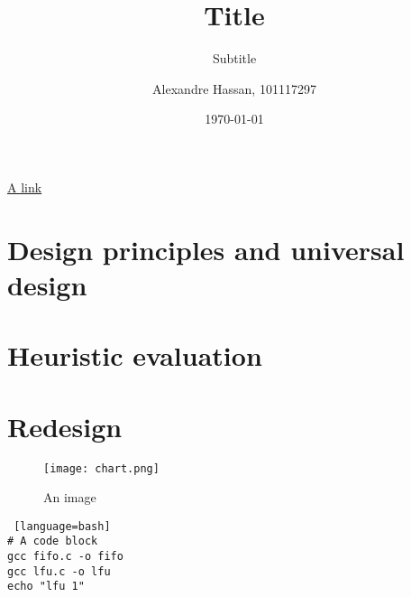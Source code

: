 \documentclass{article}
\title{Title}
\subtitle{Subtitle}
\author{Alexandre Hassan, 101117297 }
\date{\monthyeardate\today}
\begin{document}
\maketitle
\href{https://carleton.ca/}{A link}

\section{Design principles and universal design}


\section{Heuristic evaluation}


\section{Redesign}


\begin{figure}[h]
\texttt{[image: chart.png]}
\caption{An image}
\centering
\end{figure}

\begin{lstlisting} [language=bash]
# A code block
gcc fifo.c -o fifo
gcc lfu.c -o lfu
echo "lfu 1"
\end{lstlisting}
\end{document}
